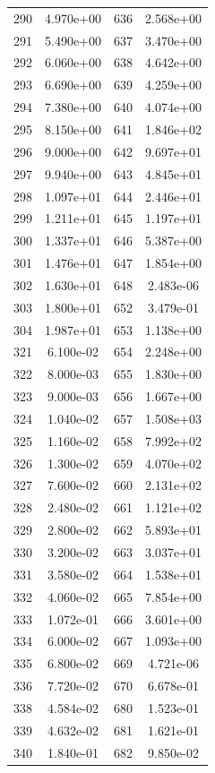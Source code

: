 \documentclass[12pt]{article}
\begin{document}
\begin{longtable}{@{}cccc@{}}
290 & 4.970e+00 & 636 & 2.568e+00 \\
291 & 5.490e+00 & 637 & 3.470e+00 \\
292 & 6.060e+00 & 638 & 4.642e+00 \\
293 & 6.690e+00 & 639 & 4.259e+00 \\
294 & 7.380e+00 & 640 & 4.074e+00 \\
295 & 8.150e+00 & 641 & 1.846e+02 \\
296 & 9.000e+00 & 642 & 9.697e+01 \\
297 & 9.940e+00 & 643 & 4.845e+01 \\
298 & 1.097e+01 & 644 & 2.446e+01 \\
299 & 1.211e+01 & 645 & 1.197e+01 \\
300 & 1.337e+01 & 646 & 5.387e+00 \\
301 & 1.476e+01 & 647 & 1.854e+00 \\
302 & 1.630e+01 & 648 & 2.483e-06 \\
303 & 1.800e+01 & 652 & 3.479e-01 \\
304 & 1.987e+01 & 653 & 1.138e+00 \\
321 & 6.100e-02 & 654 & 2.248e+00 \\
322 & 8.000e-03 & 655 & 1.830e+00 \\
323 & 9.000e-03 & 656 & 1.667e+00 \\
324 & 1.040e-02 & 657 & 1.508e+03 \\
325 & 1.160e-02 & 658 & 7.992e+02 \\
326 & 1.300e-02 & 659 & 4.070e+02 \\
327 & 7.600e-02 & 660 & 2.131e+02 \\
328 & 2.480e-02 & 661 & 1.121e+02 \\
329 & 2.800e-02 & 662 & 5.893e+01 \\
330 & 3.200e-02 & 663 & 3.037e+01 \\
331 & 3.580e-02 & 664 & 1.538e+01 \\
332 & 4.060e-02 & 665 & 7.854e+00 \\
333 & 1.072e-01 & 666 & 3.601e+00 \\
334 & 6.000e-02 & 667 & 1.093e+00 \\
335 & 6.800e-02 & 669 & 4.721e-06 \\
336 & 7.720e-02 & 670 & 6.678e-01 \\
338 & 4.584e-02 & 680 & 1.523e-01 \\
339 & 4.632e-02 & 681 & 1.621e-01 \\
340 & 1.840e-01 & 682 & 9.850e-02 \\

\end{longtable}
\end{document}
